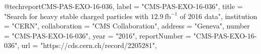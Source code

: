 @techreport{CMS-PAS-EXO-16-036,
      label          = "CMS-PAS-EXO-16-036",
      title         = "{Search for heavy stable charged particles with
                       $12.9~\mathrm{fb}^{-1}$ of 2016 data}",
      institution   = "CERN",
      collaboration = "CMS Collaboration",
      address       = "Geneva",
      number        = "CMS-PAS-EXO-16-036",
      year          = "2016",
      reportNumber  = "CMS-PAS-EXO-16-036",
      url           = "https://cds.cern.ch/record/2205281",
}

